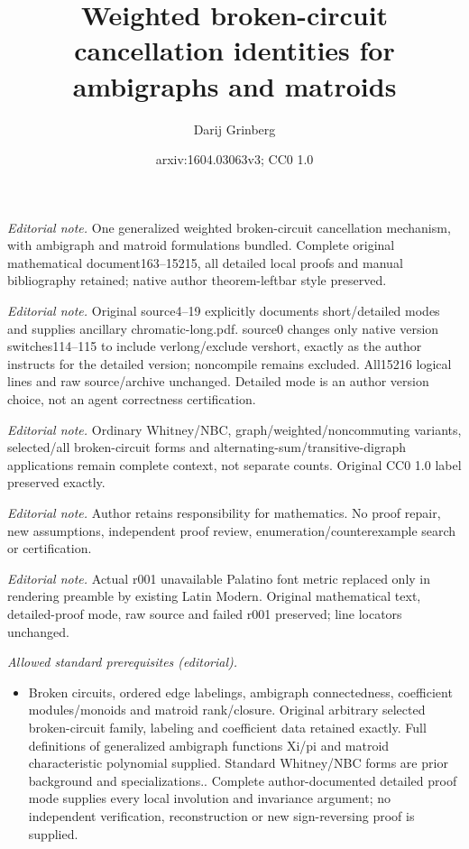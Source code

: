 \documentclass[numbers=enddot,12pt,final,onecolumn,notitlepage]{scrartcl}%
\title{Weighted broken-circuit cancellation identities for ambigraphs and matroids}
\author{Darij Grinberg}
\date{arxiv:1604.03063v3; CC0 1.0}
\theoremstyle{definition}
\begin{document}
\maketitle
\noindent\textit{Editorial note.} One generalized weighted broken-circuit cancellation mechanism, with ambigraph and matroid formulations bundled. Complete original mathematical document163--15215, all detailed local proofs and manual bibliography retained; native author theorem-leftbar style preserved.\par\medskip
\noindent\textit{Editorial note.} Original source4--19 explicitly documents short/detailed modes and supplies ancillary chromatic-long.pdf. source0 changes only native version switches114--115 to include verlong/exclude vershort, exactly as the author instructs for the detailed version; noncompile remains excluded. All15216 logical lines and raw source/archive unchanged. Detailed mode is an author version choice, not an agent correctness certification.\par\medskip
\noindent\textit{Editorial note.} Ordinary Whitney/NBC, graph/weighted/noncommuting variants, selected/all broken-circuit forms and alternating-sum/transitive-digraph applications remain complete context, not separate counts. Original CC0 1.0 label preserved exactly.\par\medskip
\noindent\textit{Editorial note.} Author retains responsibility for mathematics. No proof repair, new assumptions, independent proof review, enumeration/counterexample search or certification.\par\medskip
\noindent\textit{Editorial note.} Actual r001 unavailable Palatino font metric replaced only in rendering preamble by existing Latin Modern. Original mathematical text, detailed-proof mode, raw source and failed r001 preserved; line locators unchanged.\par\medskip
\noindent\textit{Allowed standard prerequisites (editorial).}\begin{itemize}
\item Broken circuits, ordered edge labelings, ambigraph connectedness, coefficient modules/monoids and matroid rank/closure. Original arbitrary selected broken-circuit family, labeling and coefficient data retained exactly. Full definitions of generalized ambigraph functions Xi/pi and matroid characteristic polynomial supplied. Standard Whitney/NBC forms are prior background and specializations.. Complete author-documented detailed proof mode supplies every local involution and invariance argument; no independent verification, reconstruction or new sign-reversing proof is supplied.
\end{itemize}\medskip
\end{document}
